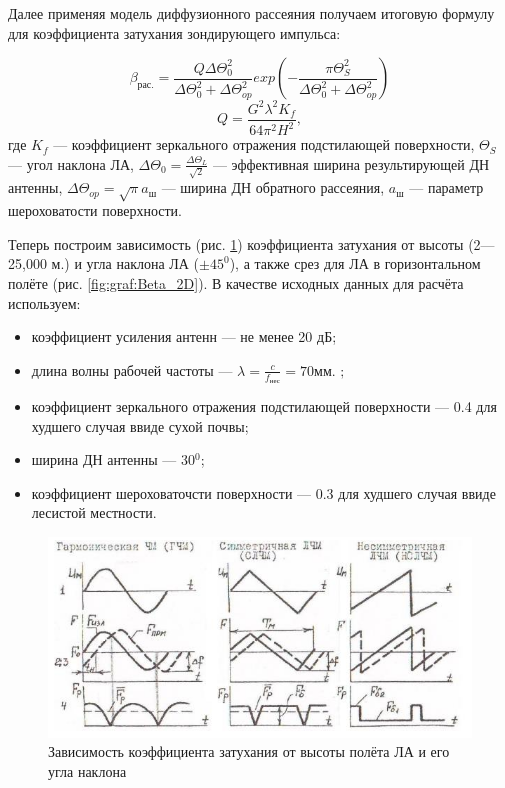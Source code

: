 \documentclass[utf8x, 14pt, oneside, a4paper]{article}
\begin{document}
			Далее применяя модель диффузионного рассеяния получаем итоговую формулу для коэффициента затухания зондирующего импульса:
			
			\begin{equation}
				\beta_{\text{рас.}}=\frac{Q\Delta\Theta_{0}^{2}}{\Delta\Theta_{0}^{2}+\Delta\Theta_{op}^{2}}exp\left(-\frac{\pi\Theta_{S}^{2}}{\Delta\Theta_{0}^{2}+\Delta\Theta_{op}^{2}}\right)
			\end{equation}	
			\begin{equation}
				Q=\frac{G^{2}\lambda^{2}K_{f}}{64\pi^{2}H^{2}},
			\end{equation}
			где $K_{f}$ --- коэффициент зеркального отражения подстилающей поверхности, $\Theta_{S}$ --- угол наклона ЛА, $\Delta\Theta_{0}=\frac{\Delta\Theta_{L}}{\sqrt{2}}$ --- эффективная ширина результирующей ДН антенны, $\Delta\Theta_{op}=\sqrt{\pi}a_{\text{ш}}$ --- ширина ДН обратного рассеяния, $a_{\text{ш}}$ --- параметр шероховатости поверхности.
			
			Теперь построим зависимость (рис. \ref{fig:graf:Beta_3D}) коэффициента затухания от высоты (2---25,000 м.) и угла наклона ЛА ($\pm45^{0}$), а также срез для ЛА в горизонтальном полёте (рис. \ref{fig:graf:Beta_2D}). В качестве исходных данных для расчёта используем:
			
			\begin{itemize}
				\item коэффициент усиления антенн --- не менее 20 дБ;
				\item длина волны рабочей частоты --- $\lambda=\frac{c}{f_{\text{нес}}}=70 \text{мм. ;}$
				\item коэффициент зеркального отражения подстилающей поверхности --- 0.4 для худшего случая ввиде сухой почвы;
				\item ширина ДН антенны --- 30$^0$;
				\item коэффициент шероховаточсти поверхности --- 0.3 для худшего случая ввиде лесистой местности.
			\end{itemize}
			
			\begin{figure}[H]
				\centering
				\includegraphics[width=0.7\linewidth]{"Рисунки/Коэффициент затухания 3Д"}
				\caption{Зависимость коэффициента затухания от высоты полёта ЛА и его угла наклона}
				\label{fig:graf:Beta_3D}
			\end{figure}
		
\end{document}

